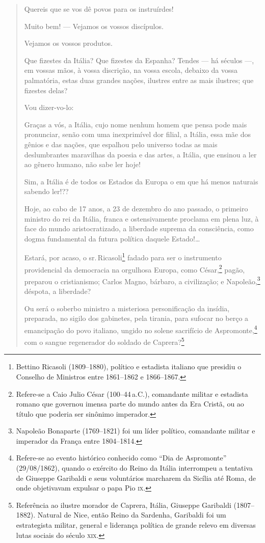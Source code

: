 \begin{quote}
Quereis que se vos dê povos para os instruírdes!

Muito bem! --- Vejamos os vossos discípulos.

Vejamos os vossos produtos.

Que fizestes da Itália? Que fizestes da Espanha? Tendes --- há séculos ---,
em vossas mãos, à vossa discrição, na vossa escola, debaixo da vossa
palmatória, estas duas grandes nações, ilustres entre as mais ilustres;
que fizestes delas?

Vou dizer-vo-lo:

Graças a vós, a Itália, cujo nome nenhum homem que pensa pode mais
pronunciar, senão com uma inexprimível dor filial, a Itália, essa mãe
dos gênios e das nações, que espalhou pelo universo todas as mais
deslumbrantes maravilhas da poesia e das artes, a Itália, que ensinou a
ler ao gênero humano, não sabe ler hoje!

Sim, a Itália é de todos os Estados da Europa o em que há menos naturais
sabendo ler!??

Hoje, ao cabo de 17 anos, a 23 de dezembro do ano passado, o primeiro
ministro do rei da Itália, franca e ostensivamente proclama em plena
luz, à face do mundo aristocratizado, a liberdade suprema da
consciência, como dogma fundamental da futura política daquele
Estado!\ldots{}

Estará, por acaso, o sr.\,Ricasoli\footnote{Bettino Ricasoli
  (1809--1880), político e estadista italiano que presidiu o Conselho de
  Ministros entre 1861--1862 e 1866--1867.} fadado para ser o instrumento
providencial da democracia na orgulhosa Europa, como César,\footnote{
  Refere-se a Caio Julio César (100--44\,a.C.), comandante militar e
  estadista romano que governou imensa parte do mundo antes da Era
  Cristã, ou ao título que poderia ser sinônimo imperador.} pagão,
preparou o cristianismo; Carlos Magno, bárbaro, a civilização; e
Napoleão,\footnote{Napoleão Bonaparte (1769--1821) foi um líder
  político, comandante militar e imperador da França entre 1804--1814.\label{napoleao}}
déspota, a liberdade?

Ou será o soberbo ministro a misteriosa personificação da insídia,
preparada, no sigilo dos gabinetes, pela tirania, para sufocar no berço
a emancipação do povo italiano, ungido no solene sacrifício de
Aspromonte,\footnote{Refere-se ao evento histórico conhecido como ``Dia
  de Aspromonte'' (29/08/1862), quando o exército do Reino da Itália
  interrompeu a tentativa de Giuseppe Garibaldi e seus voluntários
  marcharem da Sicília até Roma, de onde objetivavam expulsar o papa Pio
  \textsc{ix}.} com o sangue regenerador do soldado de Caprera?\footnote{
  Referência ao ilustre morador de Caprera, Itália, Giuseppe Garibaldi
  (1807--1882). Natural de Nice, então Reino da Sardenha, Garibaldi foi
  um estrategista militar, general e liderança política de grande relevo
  em diversas lutas sociais do século \textsc{xix}.}


\end{quote}
